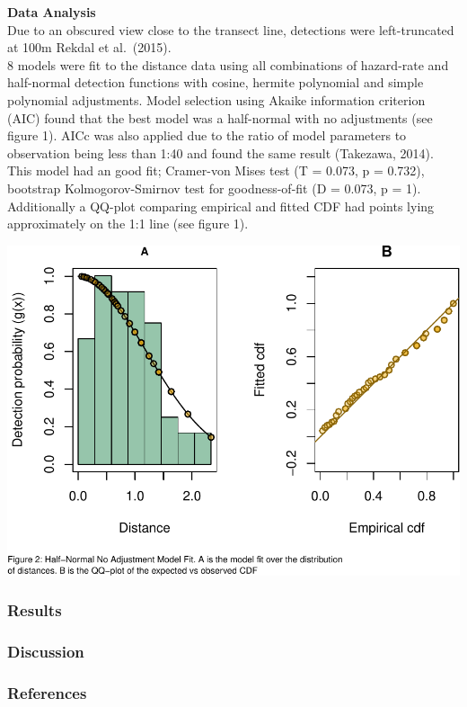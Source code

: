 \documentclass[
  12pt,
]{article}
\begin{document}
\textbf{Data Analysis}\\
Due to an obscured view close to the transect line, detections were
left-truncated at 100m Rekdal et al.~(2015).\\
8 models were fit to the distance data using all combinations of
hazard-rate and half-normal detection functions with cosine, hermite
polynomial and simple polynomial adjustments. Model selection using
Akaike information criterion (AIC) found that the best model was a
half-normal with no adjustments (see figure 1). AICc was also applied
due to the ratio of model parameters to observation being less than 1:40
and found the same result (Takezawa, 2014). This model had an good fit;
Cramer-von Mises test (T = 0.073, p = 0.732), bootstrap
Kolmogorov-Smirnov test for goodness-of-fit (D = 0.073, p = 1).
Additionally a QQ-plot comparing empirical and fitted CDF had points
lying approximately on the 1:1 line (see figure 1).

\includegraphics{Whale-Abundance_files/figure-latex/Model Fit Plot-1.pdf}

\hypertarget{results}{%
\subsubsection{Results}\label{results}}

\hypertarget{discussion}{%
\subsubsection{Discussion}\label{discussion}}

\hypertarget{references}{%
\subsubsection{References}\label{references}}
\end{document}

